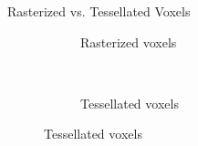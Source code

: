 \documentclass[10pt]{beamer}
\begin{document}
\begin{frame}{Rasterized vs. Tessellated Voxels}

  \begin{figure}
    \begin{subfigure}[t]{0.475\textwidth}
      \caption*{Rasterized voxels}
    \end{subfigure}
    ~
    \begin{subfigure}[t]{0.475\textwidth}
      \caption*{Tessellated voxels}
    \end{subfigure}
  \end{figure}
\end{frame}
\end{document}
